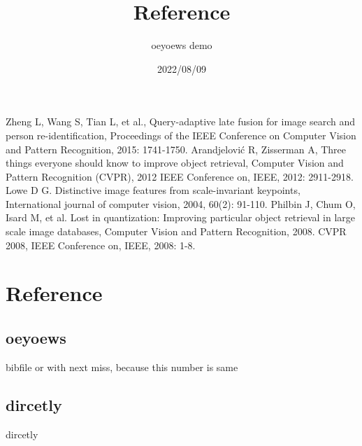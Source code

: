 \documentclass{article}
\title{Reference}
\author{oeyoews demo}
\date{2022/08/09}
\begin{document}
\maketitle

\begin{thebibliography}{99}
Zheng L, Wang S, Tian L, et al., Query-adaptive late fusion for image search and person re-identification, Proceedings of the IEEE Conference on Computer Vision and Pattern Recognition, 2015: 1741-1750.
Arandjelović R, Zisserman A, Three things everyone should know to improve object retrieval, Computer Vision and Pattern Recognition (CVPR), 2012 IEEE Conference on, IEEE, 2012: 2911-2918.
Lowe D G. Distinctive image features from scale-invariant keypoints, International journal of computer vision, 2004, 60(2): 91-110.
Philbin J, Chum O, Isard M, et al. Lost in quantization: Improving particular object retrieval in large scale image databases, Computer Vision and Pattern Recognition, 2008. CVPR 2008, IEEE Conference on, IEEE, 2008: 1-8.
\end{thebibliography}

\section{Reference}




\subsection{oeyoews}%

bibfile or with next miss, because this number is same
\cite{oeyoews}

\subsection{dircetly}%
\label{sub:dircetly}

dircetly
\cite{ref1}
\end{document}

